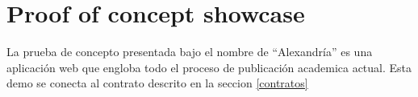\section{Proof of concept showcase}
\label{poc}
La prueba de concepto presentada bajo el nombre de ``Alexandría'' es una
aplicación web que engloba todo el proceso de publicación academica actual. Esta
demo se conecta al contrato descrito en la seccion \ref{contratos}



